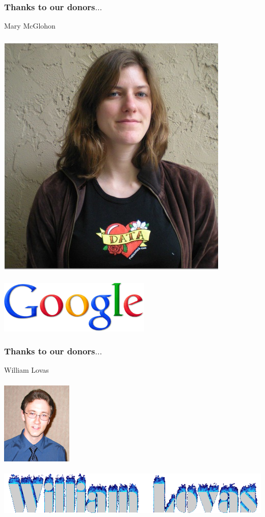 \documentclass{beamer}
\begin{document}
\begin{frame}
\frametitle{Thanks to our donors$\dots$}
Mary McGlohon \\ ~ \\
\includegraphics[scale=.3]{mcglohon.jpg} \\
~ \\
\includegraphics[scale=.5]{google.png}
\end{frame}

\begin{frame}
\frametitle{Thanks to our donors$\dots$}
William Lovas \\ ~\\
\includegraphics[scale=.5]{lovas.jpg} \\ ~ \\
\includegraphics[scale=.5]{lovas-1.png}
\end{frame}
\end{document}
